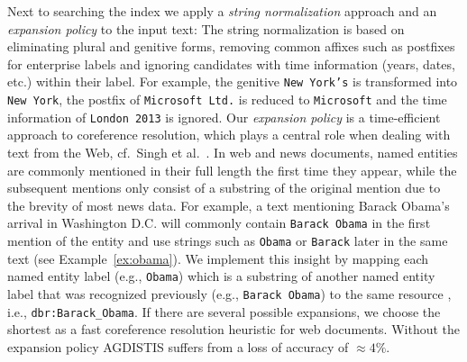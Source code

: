 Next to searching the index we apply a \emph{string normalization} approach and an \emph{expansion policy} to the input text:
The string normalization is based on eliminating plural and genitive forms, removing common affixes such as postfixes for enterprise labels and ignoring candidates with time information (years, dates, etc.) within their label.
For example, the genitive \texttt{New York's} is transformed into \texttt{New York}, the postfix of \texttt{Microsoft Ltd.} is reduced to \texttt{Microsoft} and the time information of \texttt{London 2013} is ignored.
Our \emph{expansion policy} is a time-efficient approach to coreference resolution, which plays a central role when dealing with text from the Web, cf.~Singh et al.~\cite{singh}. 
In web and news documents, named entities are commonly mentioned in their full length the first time they appear, while the subsequent mentions only consist of a substring of the original mention due to the brevity of most news data.
For example, a text mentioning Barack Obama's arrival in Washington D.C. will commonly contain \texttt{Barack Obama} in the first mention of the entity and use strings such as \texttt{Obama} or \texttt{Barack} later in the same text (see Example~\ref{ex:obama}).
We implement this insight by mapping each named entity label (e.g., \texttt{Obama}) which is a substring of another named entity label that was recognized previously (e.g., \texttt{Barack Obama}) to the same resource ,\,i.e., \texttt{dbr:Barack\_Obama}.
If there are several possible expansions, we choose the shortest as a fast coreference resolution heuristic for web documents.
Without the expansion policy AGDISTIS suffers from a loss of accuracy of $\approx4\%$.




